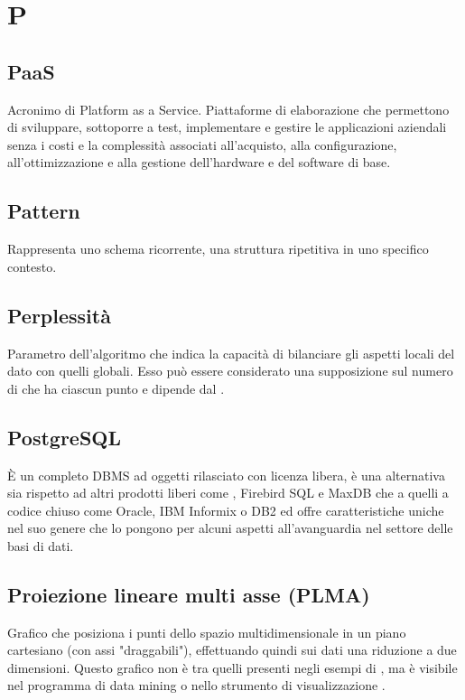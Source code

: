 \section*{P}
\markright{}
\subsection*{PaaS}
Acronimo di Platform as a Service. Piattaforme di elaborazione che permettono di sviluppare, sottoporre a test, implementare e gestire le applicazioni aziendali senza i costi e la complessità associati all'acquisto, alla configurazione, all'ottimizzazione e alla gestione dell'hardware e del software di base. 

\subsection*{Pattern}
Rappresenta uno schema ricorrente, una struttura ripetitiva in uno specifico contesto. 

\subsection*{Perplessità}
Parametro dell'algoritmo  che indica la capacità di bilanciare gli aspetti locali del dato con quelli globali. Esso può essere considerato una supposizione sul numero di  che ha ciascun punto e dipende dal .  

\subsection*{PostgreSQL}
È un completo DBMS ad oggetti rilasciato con licenza libera, è una alternativa sia rispetto ad altri prodotti liberi come , Firebird SQL e MaxDB che a quelli a codice chiuso come Oracle, IBM Informix o DB2 ed offre caratteristiche uniche nel suo genere che lo pongono per alcuni aspetti all'avanguardia nel settore delle basi di dati.

\subsection*{Proiezione lineare multi asse (PLMA)}
Grafico che posiziona i punti dello spazio multidimensionale in un piano cartesiano (con assi "draggabili"), effettuando quindi sui dati una riduzione a due dimensioni. Questo grafico non è tra quelli presenti negli esempi di , ma è visibile nel programma di data mining  o nello strumento di visualizzazione .

